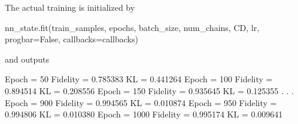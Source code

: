 \documentclass[submission, Phys]{SciPost}
\begin{document}
The actual training is initialized by
\begin{python}
nn_state.fit(train_samples, epochs, batch_size, num_chains, CD, lr, progbar=False, callbacks=callbacks)
\end{python}
and outputs
\begin{python}
	Epoch = 50	Fidelity = 0.785383	KL = 0.441264
	Epoch = 100	Fidelity = 0.894514	KL = 0.208556
	Epoch = 150	Fidelity = 0.935645	KL = 0.125355
	.
	.
	.
	Epoch = 900	Fidelity = 0.994565	KL = 0.010874
	Epoch = 950	Fidelity = 0.994806	KL = 0.010380
	Epoch = 1000	Fidelity = 0.995174	KL = 0.009641
\end{python}

%


\end{document}
